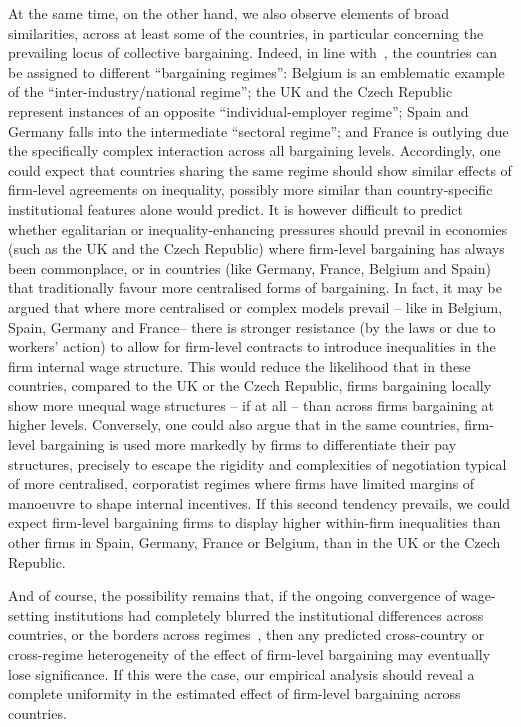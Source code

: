 \documentclass[12pt]{article}
\begin{document}
At the same time, on the other hand, we also observe elements of broad similarities, across at least some of the countries, in particular concerning the prevailing locus of collective bargaining. Indeed, in line with~\cite{fulton.2013}, the countries can be assigned to different “bargaining regimes”: Belgium is an emblematic example of the “inter-industry/national regime”; the UK and the Czech Republic represent instances of an opposite “individual-employer regime”; Spain and Germany falls into the intermediate “sectoral regime”; and France is outlying due the specifically complex interaction across all bargaining levels. Accordingly, one could expect that countries sharing the same regime should show similar effects of firm-level agreements on inequality, possibly more similar than country-specific institutional features alone would predict. It is however difficult to predict whether egalitarian or inequality-enhancing pressures should prevail in economies (such as the UK and the Czech Republic) where firm-level bargaining has always been commonplace, or in countries (like Germany, France, Belgium and Spain) that traditionally favour more centralised forms of bargaining. In fact, it may be argued that where more centralised or complex models prevail -- like in Belgium, Spain, Germany and France-- there is stronger resistance (by the laws or due to workers' action) to allow for firm-level contracts to introduce inequalities in the firm internal wage structure. This would reduce the likelihood that in these countries, compared to the UK or the Czech Republic, firms bargaining locally show more unequal wage structures -- if at all -- than across firms bargaining at higher levels. Conversely, one could also argue that in the same countries, firm-level bargaining is used more markedly by firms to differentiate their pay structures, precisely to escape the rigidity and complexities of negotiation typical of more centralised, corporatist regimes where firms have limited margins of manoeuvre to shape internal incentives. If this second tendency prevails, we could expect firm-level bargaining firms to display higher within-firm inequalities than other firms in Spain, Germany, France or Belgium, than in the UK or the Czech Republic.

And of course, the possibility remains that, if the ongoing convergence of wage-setting institutions had completely blurred the institutional differences across countries, or the borders across regimes~\citep[see][]{baccaro2017trajectories}, then any predicted cross-country or cross-regime heterogeneity of the effect of firm-level bargaining may eventually lose significance. If this were the case, our empirical analysis should reveal a complete uniformity in the estimated effect of firm-level bargaining across countries. 
\end{document}
